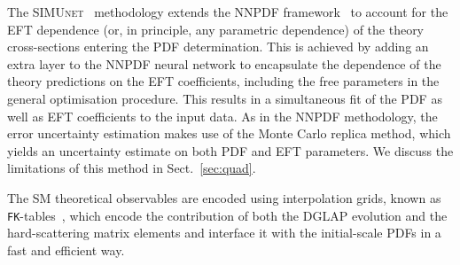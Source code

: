 \documentclass[withindex,glossary]{cam-thesis}
\newcommand{\simunet}{\textsc{SIMUnet}}
\newcommand{\JM}[1]{{\bf\color{cyan}JM: #1}}
\begin{document}
The  \simunet{}~\cite{Iranipour:2022iak}
methodology extends the  NNPDF framework~\cite{NNPDF:2021njg, NNPDF:2021uiq} to
account for the EFT dependence (or, in principle, any parametric dependence) 
of the theory cross-sections entering the
PDF determination.
%
This is achieved by adding an extra layer to the NNPDF neural network to
encapsulate the dependence of the theory predictions on the EFT coefficients,
including the free parameters in the general optimisation procedure. This
results in a simultaneous fit of the PDF as well as EFT coefficients to the
input data.
%
As in the NNPDF methodology, the error uncertainty estimation makes use of the Monte
Carlo replica method, which yields an uncertainty estimate on both PDF and EFT
parameters.  We discuss the limitations of this method in Sect.~\ref{sec:quad}.

The SM theoretical observables are encoded using interpolation grids,
known as {\tt FK}-tables~\cite{Ball:2010de,Ball:2012cx,Bertone:2016lga}, which 
encode the contribution of both the DGLAP evolution
and the hard-scattering matrix elements and interface it with the
initial-scale PDFs in a fast and efficient way. 
%
\end{document}
